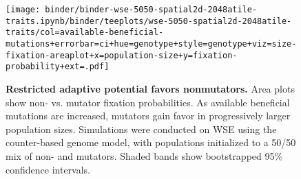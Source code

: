 \begin{figure}

\centering
\texttt{[image: binder/binder-wse-5050-spatial2d-2048atile-traits.ipynb/binder/teeplots/wse-5050-spatial2d-2048atile-traits/col=available-beneficial-mutations+errorbar=ci+hue=genotype+style=genotype+viz=size-fixation-areaplot+x=population-size+y=fixation-probability+ext=.pdf]}%
\vspace{-3ex}
\caption{
\textbf{Restricted adaptive potential favors nonmutators.}
\footnotesize
Area plots show non- vs. mutator fixation probabilities.
As available beneficial mutations are increased, mutators gain favor in progressively larger population sizes.
Simulations were conducted on WSE using the counter-based genome model, with populations initialized to a 50/50 mix of non- and mutators.
Shaded bands show bootstrapped 95\% confidence intervals.
}
\label{fig:avail-ben-muts}

\vspace{-3ex}

\end{figure}
